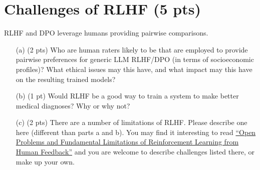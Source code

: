 \documentclass{article}
\begin{document}
\section{Challenges of RLHF (5 pts)}

RLHF and DPO leverage humans providing pairwise comparisons. 
\begin{enumerate}
    \item[(a) (2 pts)] Who are human raters likely to be that are employed to provide pairwise preferences for generic LLM RLHF/DPO (in terms of socioeconomic profiles)? What ethical issues may this have, and what impact may this have on the resulting trained models?
    \item[(b) (1 pt)] Would RLHF be a good way to train a system to make better medical diagnoses? Why or why not?
    \item[(c) (2 pts)]There are a number of limitations of RLHF. Please describe one here (different than parts a and b). You may find it interesting to read \href{https://arxiv.org/pdf/2307.15217}{``Open Problems and Fundamental Limitations of Reinforcement Learning from Human Feedback''} and you are welcome to describe challenges listed there, or make up your own.
\end{enumerate}
\end{document}
